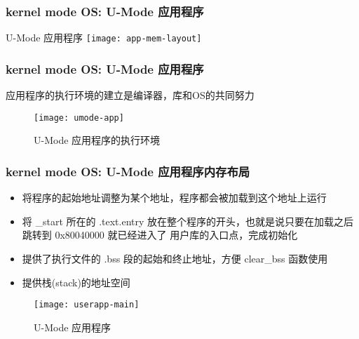 
\begin{frame}
    
    \frametitle{kernel mode OS: U-Mode 应用程序}
    U-Mode 应用程序
    \centering
    \texttt{[image: app-mem-layout]}
    
\end{frame}

\begin{frame}
	\frametitle{kernel mode OS: U-Mode 应用程序}
%		
%		

应用程序的执行环境的建立是编译器，库和OS的共同努力
	\begin{figure}
        \centering
        \texttt{[image: umode-app]}
        \caption{U-Mode 应用程序的执行环境}
    \end{figure}
\end{frame}

\begin{frame}
    \frametitle{kernel mode OS: U-Mode 应用程序内存布局}
    	\begin{itemize}
    		
    		\item 将程序的起始地址调整为某个地址，程序都会被加载到这个地址上运行
    		
    		\item 将 \_start 所在的 .text.entry 放在整个程序的开头，也就是说只要在加载之后跳转到 0x80040000 就已经进入了 用户库的入口点，完成初始化
            \item 提供了执行文件的 .bss 段的起始和终止地址，方便 clear\_bss 函数使用
            \item 提供栈(stack)的地址空间
    		
    	\end{itemize}	
    \begin{figure}
        \centering
        \texttt{[image: userapp-main]}
        \caption{U-Mode 应用程序}
    \end{figure}
\end{frame}

